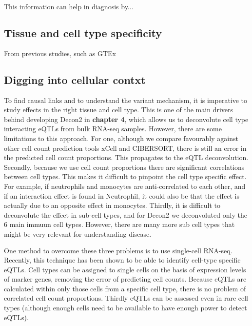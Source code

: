 This information can help in diagnosis by...

\subsection{Tissue and cell type specificity}
From previous studies, such as GTEx\cite{lonsdaleGenotypeTissueExpressionGTEx2013}


\subsection{Digging into cellular contxt}
To find causal links and to understand the variant mechanism, it is imperative to study effects in the right tissue and cell type. This is one of the main drivers behind developing Decon2 in \textbf{chapter 4}, which allows us to deconvolute cell type interacting eQTLs from bulk RNA-seq samples. However, there are some limitations to this approach. For one, although we compare favourably against other cell count prediction tools xCell\cite{aranXCellDigitallyPortraying2017} and CIBERSORT\cite{newmanRobustEnumerationCell2015}, there is still an error in the predicted cell count proportions. This propagates to the eQTL deconvolution. Secondly, because we use cell count proportions there are significant correlations between cell types. This makes it difficult to pinpoint the cell type specific effect. For example, if neutrophils and monocytes are anti-correlated to each other, and if an interaction effect is found in Neutrophil, it could also be that the effect is actually due to an opposite effect in monocytes. Thirdly, it is difficult to deconvolute the effect in sub-cell types, and for Decon2 we deconvoluted only the 6 main immuun cell types. However, there are many more sub cell types that might be very relevant for understanding disease.

One method to overcome these three problems is to use single-cell RNA-seq\cite{tangMRNASeqWholetranscriptomeAnalysis2009}. Recently, this technique has been shown to be able to identify cell-type specific eQTLs\cite{vanderwijstSinglecellRNASequencing2018b}. Cell types can be assigned to single cells on the basis of expression levels of marker genes, removing the error of predicting cell counts. Because eQTLs are calculated within only those cells from a specific cell type, there is no problem of correlated cell count proportions. Thirdly eQTLs can be assessed even in rare cell types (although enough cells need to be available to have enough power to detect eQTLs).

